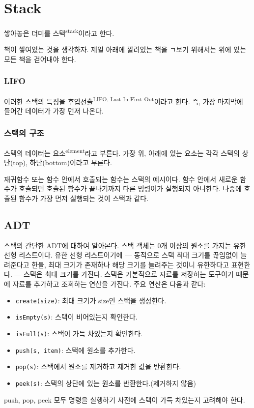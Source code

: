 \documentclass[../note.tex]{subfiles}
\begin{document}
\chapter{Stack}

\begin{definition}[스택]
  쌓아놓은 더미를 스택\textsuperscript{stack}이라고 한다.
\end{definition}
책이 쌓여있는 것을 생각하자. 제일 아래에 깔려있는 책을 ㄱ보기 위해서는 위에 있는 모든 책을 걷어내야 한다.

\subsection{LIFO}
이러한 스택의 특징을 후입선출\textsuperscript{LIFO, Last In First Out}이라고 한다. 즉, 가장 마지막에 들어간 데이터가 가장 먼저 나온다.

\subsection{스택의 구조}
스택의 데이터는 요소\textsuperscript{element}라고 부른다. 가장 위, 아래에 있는 요소는 각각 스택의 상단(top), 하단(bottom)이라고 부른다.

\begin{example}
  재귀함수 또는 함수 안에서 호출되는 함수는 스택의 예시이다. 함수 안에서 새로운 함수가 호출되면 호출된 함수가 끝나기까지 다른 명령어가 실행되지 아니한다. 나중에 호출된 함수가 가장 먼저 실행되는 것이 스택과 같다.
\end{example}

\section{ADT}
스택의 간단한 ADT에 대하여 알아본다. 스택 객체는 0개 이상의 원소를 가지는 유한 선형 리스트이다. 유한 선형 리스트이기에 --- 동적으로 스택 최대 크기를 끊임없이 늘려준다고 한들, 최대 크기가 존재하나 해당 크기를 늘려주는 것이니 유한하다고 표현한다. --- 스택은 최대 크기를 가진다. 스택은 기본적으로 자료를 저장하는 도구이기 때문에 자료를 추가하고 조회하는 연산을 가진다. 주요 연산은 다음과 같다:
\begin{itemize}
  \item \texttt{create(size)}: 최대 크기가 size인 스택을 생성한다.
  \item \texttt{isEmpty(s)}: 스택이 비어있는지 확인한다.
  \item \texttt{isFull(s)}: 스택이 가득 차있는지 확인한다.
  \item \texttt{push(s, item)}: 스택에 원소를 추가한다.
  \item \texttt{pop(s)}: 스택에서 원소를 제거하고 제거한 값을 반환한다.
  \item \texttt{peek(s)}: 스택의 상단에 있는 원소를 반환한다.(제거하지 않음)
\end{itemize}
push, pop, peek 모두 명령을 실행하기 사전에 스택이 가득 차있는지 고려해야 한다.
\end{document}
